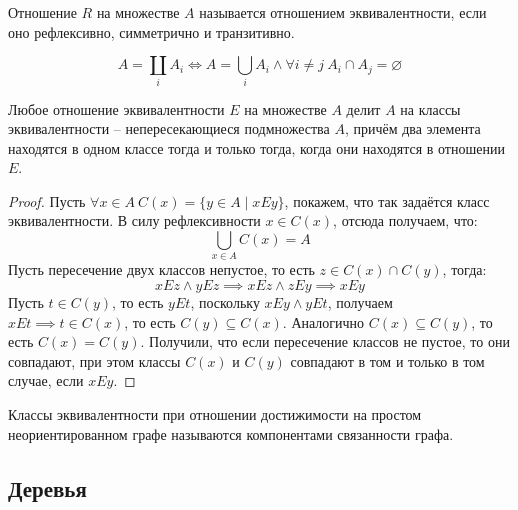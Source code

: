 \documentclass[12pt]{article}
\begin{document}
\begin{definition}
	Отношение $R$ на множестве $A$ называется отношением
	эквивалентности, если оно рефлексивно, симметрично и транзитивно.
\end{definition}
\begin{definition}
	\[A=\coprod_i A_i\iff A=\bigcup_i A_i\land \forall i\neq j\ A_i\cap
	A_j=\varnothing\]
\end{definition}
\begin{theorem}
	Любое отношение эквивалентности $E$ на множестве $A$ делит $A$ на
	классы эквивалентности -- непересекающиеся подмножества $A$, причём
	два элемента находятся в одном классе тогда и только тогда, когда
	они находятся в отношении $E$.
	\begin{proof}
		Пусть $\forall x\in A\ C(x)=\{y\in A\mid xEy\}$, покажем, что так
		задаётся класс эквивалентности. В силу рефлексивности $x\in C(x)$,
		отсюда получаем, что:
		\[\bigcup_{x\in A}C(x)=A\]
		Пусть пересечение двух классов непустое, то есть $z\in C(x)\cap C(y)$, тогда:
		\[xEz\land yEz\implies xEz\land zEy\implies xEy\]
		Пусть $t\in C(y)$, то есть $yEt$, поскольку $xEy\land yEt$,
		получаем $xEt\implies t\in C(x)$, то есть $C(y)\subseteq C(x)$.
		Аналогично $C(x)\subseteq C(y)$, то есть $C(x)=C(y)$. Получили, что
		если пересечение классов не пустое, то они совпадают, при этом
		классы $C(x)$ и $C(y)$ совпадают в том и только в том случае, если $xEy$.
	\end{proof}
\end{theorem}
\begin{definition}
	Классы эквивалентности при отношении достижимости на простом
	неориентированном графе называются компонентами связанности графа.
\end{definition}

\subsection{Деревья}
\end{document}
